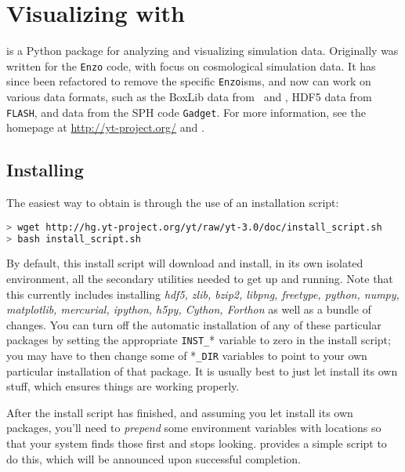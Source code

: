 \section{Visualizing with \yt}
\yt is a Python package for analyzing and visualizing simulation data.
Originally \yt was written for the {\tt Enzo} code, with focus on
cosmological simulation data.  It has since been refactored to remove
the specific {\tt Enzo}isms, and now can work on various data formats,
such as the BoxLib data from \maestro\ and \castro, HDF5 data
from {\tt FLASH}, and data from the SPH code {\tt Gadget}.  For more
information, see the \yt homepage at \url{http://yt-project.org/} and
\cite{yt}.


\subsection{Installing \yt}
The easiest way to obtain \yt is through the use of an installation script:
\begin{lstlisting}[language=bash,mathescape=false]
> wget http://hg.yt-project.org/yt/raw/yt-3.0/doc/install_script.sh
> bash install_script.sh
\end{lstlisting}
By default, this \yt install script will download and install, in its
own isolated environment, all the secondary utilities needed to get
\yt up and running.  Note that this currently includes installing {\it
  hdf5, zlib, bzip2, libpng, freetype, python, numpy, matplotlib,
  mercurial, ipython, h5py, Cython, Forthon} as well as a  bundle of changes.  You can turn off the automatic
installation of any of these particular packages by setting the
appropriate {\tt INST\_}* variable to zero in the install script; you
may have to then change some of *{\tt \_DIR} variables to point to
your own particular installation of that package.  It is usually best
to just let \yt install its own stuff, which ensures things are
working properly.

After the install script has finished, and assuming you let \yt
install its own packages, you'll need to {\it prepend} some
environment variables with \yt locations so that your system finds
those first and stops looking.  \yt provides a simple script to
do this, which will be announced upon successful completion.


